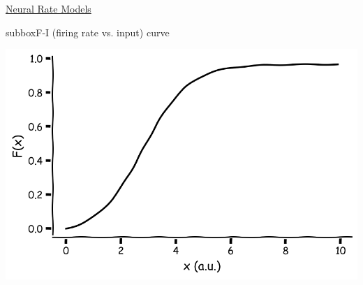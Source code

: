 \begin{textbox}{\href{https://compneuro.neuromatch.io/tutorials/W2D4_DynamicNetworks/chapter_title.html}{Neural Rate Models } }
\begin{subbox}{subbox}{F-I (firing rate vs. input) curve}
\begin{center}
\includegraphics[scale=0.18]{Figures/DN/DN_Figure1.png}
\end{center}
\end{subbox}

\end{textbox}
